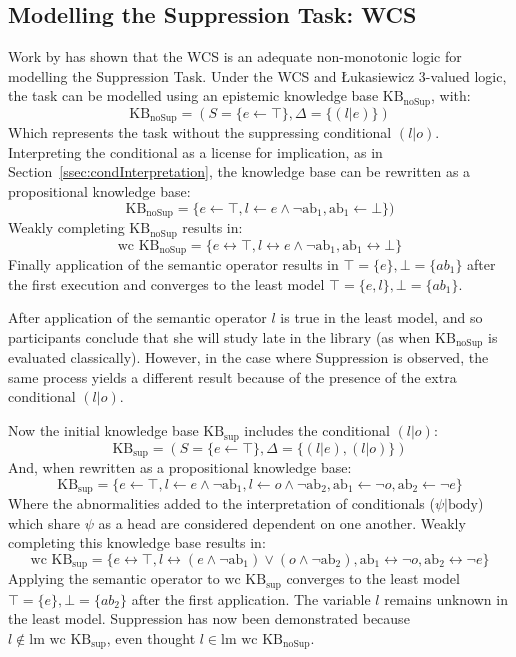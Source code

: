\subsection{Modelling the Suppression Task: WCS} \label{ssec:sup_mod}
Work by \cite{dietz2014modeling} has shown that the WCS is an adequate non-monotonic logic for modelling the Suppression Task. Under the WCS and \L ukasiewicz 3-valued logic, the task can be modelled using an epistemic knowledge base $\text{KB}_\text{noSup}$, with:
\[\text{KB}_\text{noSup}=(S=\{e \leftarrow \top\}, \Delta=\{(l|e)\})\]
Which represents the  task without the suppressing conditional $(l|o)$. Interpreting the conditional as a license for implication, as in Section~\ref{ssec:condInterpretation}, the knowledge base can be rewritten as a propositional knowledge base:
\[\text{KB}_\text{noSup}=\{e \leftarrow \top, l \leftarrow e \land \lnot \text{ab}_1, \text{ab}_1\leftarrow \bot\})\]
Weakly completing $\text{KB}_\text{noSup}$ results in:
\[\text{wc KB}_\text{noSup}=\{e \leftrightarrow \top, l \leftrightarrow e \land \lnot \text{ab}_1, \text{ab}_1\leftrightarrow \bot\}\]
Finally application of the semantic operator results in $\top=\{e\}, \bot=\{ab_1\}$ after the first execution and converges to the least model $\top=\{e,l\}, \bot=\{ab_1\}$.

After application of the semantic operator $l$ is true in the least model, and so participants conclude that she will study late in the library (as when $\text{KB}_\text{noSup}$ is evaluated classically). However, in the case where Suppression is observed, the same process yields a different result because of the presence of the extra conditional $(l|o)$.

Now the initial knowledge base $\text{KB}_\text{sup}$ includes the conditional $(l|o)$:
\[\text{KB}_\text{sup}=(S=\{e \leftarrow \top\}, \Delta=\{(l|e),(l|o)\})\]
And, when rewritten as a propositional knowledge base:
\[\text{KB}_\text{sup}=\{e \leftarrow \top, l \leftarrow e \land \lnot \text{ab}_1, l \leftarrow o \land \lnot \text{ab}_2, \text{ab}_1\leftarrow \lnot o, \text{ab}_2\leftarrow \lnot e\}\]
Where the abnormalities added to the interpretation of conditionals ($\psi|\text{body}$) which share $\psi$ as a head are considered dependent on one another. Weakly completing this knowledge base results in:
\[\text{wc KB}_\text{sup}=\{e \leftrightarrow \top, l \leftrightarrow (e \land \lnot \text{ab}_1) \lor (o \land \lnot \text{ab}_2), \text{ab}_1\leftrightarrow \lnot o, \text{ab}_2\leftrightarrow \lnot e\}\]
Applying the semantic operator to $\text{wc KB}_\text{sup}$ converges to the least model $\top=\{e\},\bot=\{ab_2\}$ after the first application. The variable $l$ remains unknown in the least model. Suppression has now been demonstrated because $l \not\in \text{lm wc KB}_\text{sup}$, even thought $l \in \text{lm wc KB}_\text{noSup}$.

